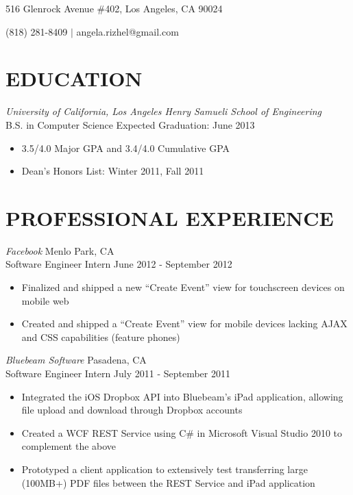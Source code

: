\documentclass{res}
\begin{document}

\begin{resume}
\centerline{516 Glenrock Avenue \#402, Los Angeles, CA 90024}
\centerline{(818) 281-8409 $|$ angela.rizhel@gmail.com }

\section{EDUCATION}
\vspace{8pt}
{\sl{University of California}, Los Angeles \hfill Henry Samueli School of Engineering} \\
B.S. in Computer Science \hfill Expected Graduation: June 2013

\begin{itemize} \itemsep -2pt %
  \item 3.5/4.0 Major GPA and 3.4/4.0 Cumulative GPA
  \item Dean's Honors List: Winter 2011, Fall 2011
\end{itemize} \vspace{-6pt}

\section{PROFESSIONAL EXPERIENCE}
\vspace{6pt}
  {\sl Facebook} \hfill Menlo Park, CA \\
  Software Engineer Intern \hfill June 2012 - September 2012

   \begin{itemize} \itemsep -2pt %
     \item Finalized and shipped a new ``Create Event'' view for touchscreen devices on mobile web
     \item Created and shipped a ``Create Event'' view for mobile devices lacking AJAX and CSS capabilities (feature phones)
   \end{itemize} \vspace{-6pt}

 {\sl Bluebeam Software} \hfill Pasadena, CA \\
 Software Engineer Intern \hfill July 2011 - September 2011

   \begin{itemize} \itemsep -2pt
   \item Integrated the iOS Dropbox API into Bluebeam's iPad application, allowing file upload and download through Dropbox accounts
   \item Created a WCF REST Service using C\# in Microsoft Visual Studio 2010 to complement the above
   \item Prototyped a client application to extensively test transferring large (100MB+) PDF files between the REST Service and iPad application
   \end{itemize} \vspace{-6pt}


\end{resume}
\end{document}
